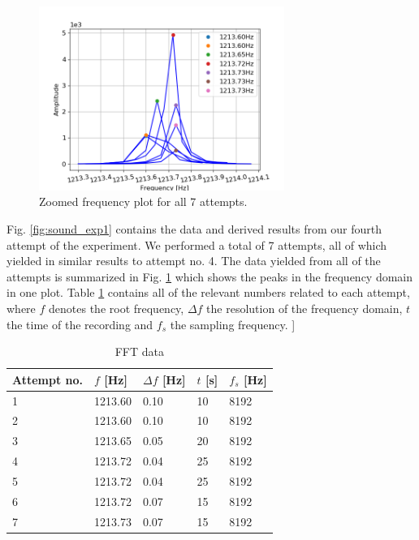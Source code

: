 \documentclass[11pt,a4paper]{article}
\begin{document}
    \begin{figure}[H]
      \centering 
      \includegraphics[width=8cm]{scripts/freq_exp2_all.png}
      \caption{Zoomed frequency plot for all 7 attempts.}
      \label{fig:sound_all}
    \end{figure}
    
    Fig. \ref{fig:sound_exp1} contains the data and derived results from our fourth attempt of the experiment. We performed a total of 7 attempts, all of which yielded in similar results to attempt no. 4. The data yielded from all of the attempts is summarized in Fig. \ref{fig:sound_all} which shows the peaks in the frequency domain in one plot.
    Table \ref{tab:fftdat} contains all of the relevant numbers related to each attempt, where $f$ denotes the root frequency, $\Delta f$ the resolution of the frequency domain, $t$ the time of the recording and $f_s$ the sampling frequency. ]


    \begin{table}[H]
      \center
      \caption{FFT data}
      \begin{tabular}{ | l | p{1.4cm} | l | l | l |}
          \hline
          Attempt no. & $f$ [Hz] & $\Delta f$ [Hz] & $t$ [s] & $f_s$ [Hz]\\ \hline
          1 & 1213.60 & 0.10 & 10 & 8192\\ \hline
          2 & 1213.60 & 0.10 & 10 & 8192\\ \hline
          3 & 1213.65 & 0.05 & 20 & 8192\\ \hline
          4 & 1213.72 & 0.04 & 25 & 8192\\ \hline
          5 & 1213.72 & 0.04 & 25 & 8192\\ \hline
          6 & 1213.72 & 0.07 & 15 & 8192\\ \hline
          7 & 1213.73 & 0.07 & 15 & 8192\\ \hline
      \end{tabular}
      \label{tab:fftdat}
    \end{table}
\end{document}
